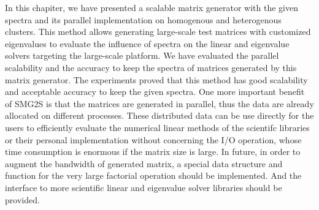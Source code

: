 In this chapiter, we have presented a scalable matrix generator with the given spectra and its parallel implementation on homogenous and heterogenous clusters. This method allows generating large-scale test matrices with customized eigenvalues to evaluate the influence of spectra on the linear and eigenvalue solvers targeting the large-scale platform. We have evaluated the parallel scalability and the accuracy to keep the spectra of matrices generated by this matrix generator. The experiments proved that this method has good scalability and acceptable accuracy to keep the given spectra. One more important benefit of SMG2S is that the matrices are generated in parallel, thus the data are already allocated on different processes. These distributed data can be use directly for the users to efficiently evaluate the numerical linear methods of the scientifc libraries or their personal implementation without concerning the I/O operation, whose time consumption is enormous if the matrix size is large. In future, in order to augment the bandwidth of generated matrix, a special data structure and function for the very large factorial operation should be implemented. And the interface to more scientific linear and eigenvalue solver libraries should be provided.


\clearemptydoublepage
